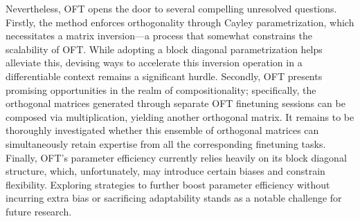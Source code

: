 Nevertheless, OFT opens the door to several compelling unresolved questions. Firstly, the method enforces orthogonality through Cayley parametrization, which necessitates a matrix inversion—a process that somewhat constrains the scalability of OFT. While adopting a block diagonal parametrization helps alleviate this, devising ways to accelerate this inversion operation in a differentiable context remains a significant hurdle. Secondly, OFT presents promising opportunities in the realm of compositionality; specifically, the orthogonal matrices generated through separate OFT finetuning sessions can be composed via multiplication, yielding another orthogonal matrix. It remains to be thoroughly investigated whether this ensemble of orthogonal matrices can simultaneously retain expertise from all the corresponding finetuning tasks. Finally, OFT's parameter efficiency currently relies heavily on its block diagonal structure, which, unfortunately, may introduce certain biases and constrain flexibility. Exploring strategies to further boost parameter efficiency without incurring extra bias or sacrificing adaptability stands as a notable challenge for future research.

